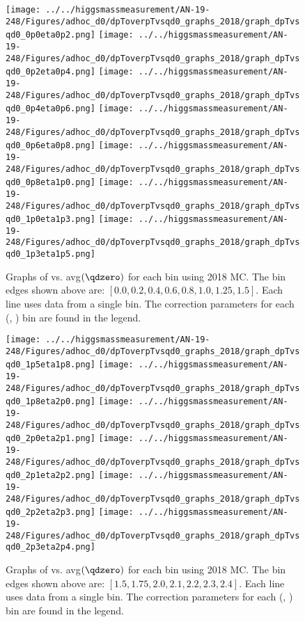 
\newpage
\begin{figure}[!htbp]
    \centering
    { \texttt{[image: ../../higgsmassmeasurement/AN-19-248/Figures/adhoc\_d0/dpToverpTvsqd0\_graphs\_2018/graph\_dpTvsqd0\_0p0eta0p2.png]}}
    { \texttt{[image: ../../higgsmassmeasurement/AN-19-248/Figures/adhoc\_d0/dpToverpTvsqd0\_graphs\_2018/graph\_dpTvsqd0\_0p2eta0p4.png]}}
    { \texttt{[image: ../../higgsmassmeasurement/AN-19-248/Figures/adhoc\_d0/dpToverpTvsqd0\_graphs\_2018/graph\_dpTvsqd0\_0p4eta0p6.png]}}
    { \texttt{[image: ../../higgsmassmeasurement/AN-19-248/Figures/adhoc\_d0/dpToverpTvsqd0\_graphs\_2018/graph\_dpTvsqd0\_0p6eta0p8.png]}}
    { \texttt{[image: ../../higgsmassmeasurement/AN-19-248/Figures/adhoc\_d0/dpToverpTvsqd0\_graphs\_2018/graph\_dpTvsqd0\_0p8eta1p0.png]}}
    { \texttt{[image: ../../higgsmassmeasurement/AN-19-248/Figures/adhoc\_d0/dpToverpTvsqd0\_graphs\_2018/graph\_dpTvsqd0\_1p0eta1p3.png]}}
    { \texttt{[image: ../../higgsmassmeasurement/AN-19-248/Figures/adhoc\_d0/dpToverpTvsqd0\_graphs\_2018/graph\_dpTvsqd0\_1p3eta1p5.png]}}
    \caption{ 
        Graphs of \pTmismeas vs. avg$(\qdzero)$ for each \abseta bin using 2018 MC.
        The \abseta bin edges shown above are: $[0.0, 0.2, 0.4, 0.6, 0.8, 1.0, 1.25, 1.5]$.
        Each line uses data from a single \pT bin. 
        The \pT correction parameters for each (\abseta, \pT) bin are found in the legend.
    }
\end{figure}
\newpage
\begin{figure}[!htbp]
    \centering
    { \texttt{[image: ../../higgsmassmeasurement/AN-19-248/Figures/adhoc\_d0/dpToverpTvsqd0\_graphs\_2018/graph\_dpTvsqd0\_1p5eta1p8.png]}}
    { \texttt{[image: ../../higgsmassmeasurement/AN-19-248/Figures/adhoc\_d0/dpToverpTvsqd0\_graphs\_2018/graph\_dpTvsqd0\_1p8eta2p0.png]}}
    { \texttt{[image: ../../higgsmassmeasurement/AN-19-248/Figures/adhoc\_d0/dpToverpTvsqd0\_graphs\_2018/graph\_dpTvsqd0\_2p0eta2p1.png]}}
    { \texttt{[image: ../../higgsmassmeasurement/AN-19-248/Figures/adhoc\_d0/dpToverpTvsqd0\_graphs\_2018/graph\_dpTvsqd0\_2p1eta2p2.png]}}
    { \texttt{[image: ../../higgsmassmeasurement/AN-19-248/Figures/adhoc\_d0/dpToverpTvsqd0\_graphs\_2018/graph\_dpTvsqd0\_2p2eta2p3.png]}}
    { \texttt{[image: ../../higgsmassmeasurement/AN-19-248/Figures/adhoc\_d0/dpToverpTvsqd0\_graphs\_2018/graph\_dpTvsqd0\_2p3eta2p4.png]}}
    \caption{ 
        Graphs of \pTmismeas vs. avg$(\qdzero)$ for each \abseta bin using 2018 MC.
        The \abseta bin edges shown above are: $[1.5, 1.75, 2.0, 2.1, 2.2, 2.3, 2.4]$.
        Each line uses data from a single \pT bin. 
        The \pT correction parameters for each (\abseta, \pT) bin are found in the legend.
    }
\end{figure}